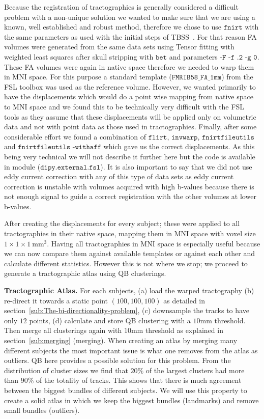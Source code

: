 \documentclass[preprint,authoryear,a4paper,10pt,onecolumn]{elsarticle}
\begin{document}
Because the registration of tractographies is generally considered a
difficult problem with a non-unique solution we wanted to make sure that
we are using a known, well established and robust method, therefore we
chose to use $\texttt{fnirt}$ with the same parameters as used with the
initial steps of TBSS~\citep{Smith2006NeuroImage}. For that reason FA
volumes were generated from the same data sets using Tensor fitting with
weighted least squares after skull stripping with $\texttt{bet}$ and
parameters $\texttt{-F -f .2 -g 0}$. These FA volumes were again in
native space therefore we needed to warp them in MNI space. For this
purpose a standard template ($\texttt{FMRIB58\_FA\_1mm}$) from the FSL
toolbox was used as the reference volume. However, we wanted primarily
to have the displacements which would do a point wise mapping from
native space to MNI space and we found this to be technically very
difficult with the FSL tools as they assume that these displacements
will be applied only on volumetric data and not with point data as those
used in tractographies. Finally, after some considerable effort we found
a combination of $\texttt{flirt}$, $\texttt{invwarp}$,
$\texttt{fnirtfileutils}$ and $\texttt{fnirtfileutils -withaff}$ which
gave us the correct displacements. As this being very technical we will
not describe it further here but the code is available in module
($\texttt{dipy.external.fsl}$). It is also important to say that we
did not use eddy current correction with any of this type of data sets as
eddy current correction is unstable with volumes acquired with high b-values because there
is not enough signal to guide a correct registration with the other
volumes at lower b-values.

After creating the displacements for every subject; these were applied
to all tractographies in their native space, mapping them in MNI
space with voxel size $1\times1\times1~\textrm{mm}^{3}$. Having all
tractographies in MNI space is especially useful because we can now
compare them against available templates or against each other and
calculate different statistics. However this is not where we stop; we
proceed to generate a tractographic atlas using QB clusterings.

\textbf{Tractographic Atlas.} For each subjects, (a) load the warped
tractography (b) re-direct it towards a static point $(100,100,100)$ as
detailed in section~\ref{sub:The-bi-directionality-problem}, (c)
downsample the tracks to have only $12$ points, (d) calculate and store
QB clustering with a $10$mm threshold. Then merge all clusterings again
with $10$mm threshold as explained in section~\ref{sub:merging}
(merging). When creating an atlas by merging many different subjects
the most important issue is what one removes from the atlas as
outliers. QB here provides a possible solution for this problem. From
the distribution of cluster sizes we find that $20\%$ of the largest
clusters had more than $90\%$ of the totality of tracks. This shows that
there is much agreement between the biggest bundles of different
subjects.  We will use this property to create a solid atlas in which we
keep the biggest bundles (landmarks) and remove small bundles
(outliers).
\end{document}

